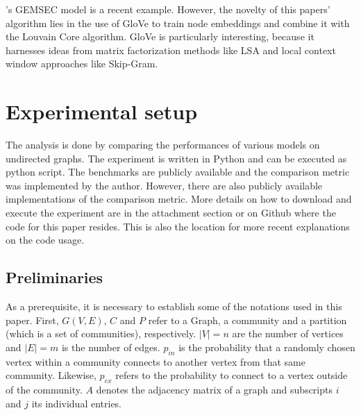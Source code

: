 \documentclass[11pt, twocolumn]{article}
\begin{document}
\citeauthor{rozemberczki_GEMSECGraphEmbedding_2019}'s GEMSEC model is a recent example.\cite{rozemberczki_GEMSECGraphEmbedding_2019} However, the novelty of this papers' algorithm lies in the use of GloVe to train node embeddings and combine it with the Louvain Core algorithm.\cite{pennington_GloveGlobalVectors_2014} GloVe is particularly interesting, because it harnesses ideas from matrix factorization methods like LSA and local context window approaches like Skip-Gram.  

\section{Experimental setup}
\label{sec:experiment}
The analysis is done by comparing the performances of various models on undirected graphs. The experiment is written in Python and can be executed as python script. The benchmarks are publicly available and the comparison metric was implemented by the author. However, there are also publicly available implementations of the comparison metric. More details on how to download and execute the experiment are in the attachment section or on Github where the code for this paper resides. This is also the location for more recent explanations on the code usage.

\subsection{Preliminaries}
As a prerequisite, it is necessary to establish some of the notations used in this paper. First, $G(V,E)$, $C$ and $P$ refer to a Graph, a community and a partition (which is a set of communities), respectively. $|V|= n$ are the number of vertices and $|E|=m$ is the number of edges. $p_{in}$ is the probability that a randomly chosen vertex within a community connects to another vertex from that same community. Likewise, $p_{ex}$ refers to the probability to connect to a vertex outside of the community. $A$ denotes the adjacency matrix of a graph and subscripts $i$ and $j$ its individual entries.
\end{document}
